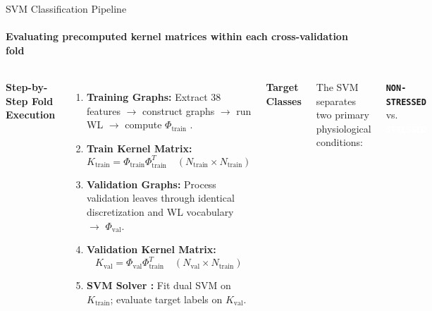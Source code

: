 \documentclass[aspectratio=169, 11pt]{beamer}
\begin{document}
\begin{frame}{SVM Classification Pipeline}
    \framesubtitle{Evaluating precomputed kernel matrices within each cross-validation fold}

    \begin{columns}[T]
        \textbf{Step-by-Step Fold Execution}
        \vspace{0.15cm}

        \begin{enumerate}\scriptsize
            \item \textbf{Training Graphs:} Extract 38 features $\rightarrow$ construct graphs $\rightarrow$ run WL $\rightarrow$ compute $\Phi_{\text{train}}$ \cite{shervashidze2011weisfeiler}.
            \item \textbf{Train Kernel Matrix:}
            \begin{equation*}
                K_{\text{train}} = \Phi_{\text{train}}\Phi_{\text{train}}^T \quad (N_{\text{train}} \times N_{\text{train}})
            \end{equation*}
            \item \textbf{Validation Graphs:} Process validation leaves through identical discretization and WL vocabulary $\rightarrow$ $\Phi_{\text{val}}$.
            \item \textbf{Validation Kernel Matrix:}
            \begin{equation*}
                K_{\text{val}} = \Phi_{\text{val}}\Phi_{\text{train}}^T \quad (N_{\text{val}} \times N_{\text{train}})
            \end{equation*}
            \item \textbf{SVM Solver \cite{cortes1995support, chang2011libsvm}:} Fit dual SVM on $K_{\text{train}}$; evaluate target labels on $K_{\text{val}}$.
        \end{enumerate}

        \textbf{Target Classes}
        \vspace{0.15cm}

        {\footnotesize The SVM separates two primary physiological conditions:}
        \begin{center}
            \colorbox{maroonSoft}{\textbf{\texttt{NON-STRESSED}}} \quad vs. \quad \colorbox{amritaMaroon}{\textcolor{white}{\textbf{\texttt{STRESSED}}}}
        \end{center}

        \vspace{0.25cm}
    \end{columns}
\end{frame}
\end{document}
